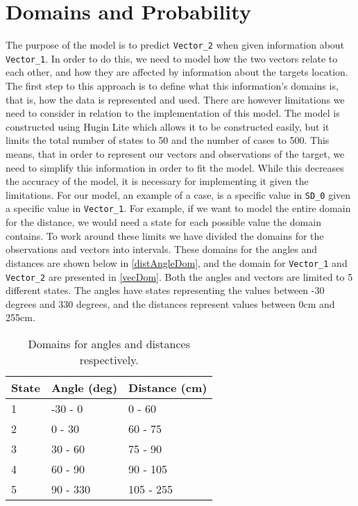 \section{Domains and Probability}\label{MID}
The purpose of the model is to predict \texttt{Vector\_2} when given information
about \texttt{Vector\_1}. In order to do this, we need to model how the two
vectors relate to each other, and how they are affected by information about the
targets location. The first step to this approach is to define what this
information's domains is, that is, how the data is represented and used.
There are however limitations we need to consider in relation to the
implementation of this model. The model is constructed using Hugin Lite
\citep{Hugin} which allows it to be constructed easily, but it limits the total
number of states to 50 and the number of cases to 500. This means, that in order
to represent our vectors and observations of the target, we need to simplify
this information in order to fit the model. While this decreases the accuracy of
the model, it is necessary for implementing it given the limitations. For our
model, an example of a case, is a specific value in \texttt{SD\_0} given a
specific value in \texttt{Vector\_1}. For example, if we want to model the
entire domain for the distance, we would need a state for each possible value
the domain contains. To work around these limits we have divided the domains
for the observations and vectors into intervals. These domains for the angles
and distances are shown below in \autoref{distAngleDom}, and the domain for
\texttt{Vector\_1} and \texttt{Vector\_2} are presented in \autoref{vecDom}.
Both the angles and vectors are limited to 5 different states. The angles have
states representing the values between -30 degrees and 330 degrees, and the
distances represent values between 0cm and 255cm.

\begin{table}[H]
\centering
\label{distAngleDom}
\begin{tabular}{l|l|l}
State & Angle (deg) & Distance (cm) \\ \hline
1     & -30 - 0     & 0 - 60        \\
2     & 0 - 30      & 60 - 75       \\
3     & 30 - 60     & 75 - 90       \\
4     & 60 - 90     & 90 - 105      \\
5     & 90 - 330    & 105 - 255     
\end{tabular}
\caption{Domains for angles and distances respectively.}
\end{table}

